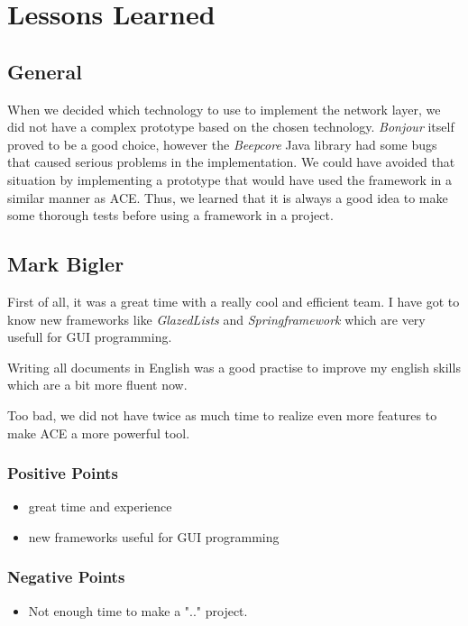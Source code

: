 \chapter{Lessons Learned}
\label{chapter:lessonslearned}



\section{General}
When we decided which technology to use to implement the network layer, we did
not have a complex prototype based on the chosen technology. \emph{Bonjour}
itself proved to be a good choice, however the \emph{Beepcore} Java library had 
some bugs that caused serious problems in the implementation. We could have
avoided that situation by implementing a prototype that would have used
the framework in a similar manner as ACE. Thus, we learned that it is
always a good idea to make some thorough tests before using a framework
in a project.



\section{Mark Bigler}
First of all, it was a great time with a really cool and efficient team. I have got to know new frameworks like \textit{GlazedLists} and \textit{Springframework} which are very usefull for GUI programming.

Writing all documents in English was a good practise to improve my english skills which are a bit more fluent now.

Too bad, we did not have twice as much time to realize even more features to make ACE a more powerful tool.
\subsection{Positive Points}
\begin{itemize}
\item great time and experience
\item new frameworks useful for GUI programming
\end{itemize}

\subsection{Negative Points}
\begin{itemize}
\item Not enough time to make a ".." project.
\end{itemize}



